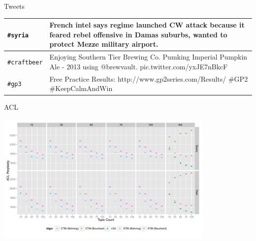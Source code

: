 \documentclass[xcolor=dvipsnames]{beamer}
\begin{document}
\begin{frame}{Tweets}
{{{\begin{tabular}{| l || p{9cm} | }
    {\tiny \tt \#syria} & 	{\tiny French intel says regime launched CW attack because it feared rebel offensive in Damas suburbs, wanted to protect Mezze military airport.} \\ \hline
    {\tiny \tt \#craftbeer} & 	{\tiny Enjoying Southern Tier Brewing Co. Pumking Imperial Pumpkin Ale - 2013 using @brewvault. pic.twitter.com/yxJE7nBkcF} \\ \hline
    {\tiny \tt \#gp3} & 	{\tiny Free Practice Results: http://www.gp2series.com/Results/ \#GP2 \#KeepCalmAndWin} \\ \hline
        \end{tabular}
        }
    }
}
\end{frame}

\begin{frame}{ACL}
 {
    \begin{center}
      \includegraphics[height=2.5in]{Images/acl-all.pdf}
    \end{center}
}


\end{frame}
\end{document}

